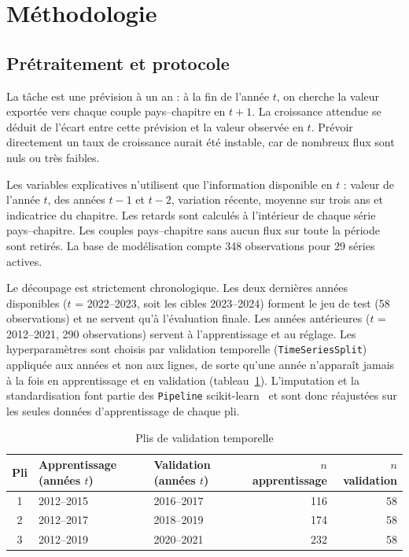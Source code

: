 \documentclass[11pt,a4paper]{article}
\begin{document}
\section{Méthodologie}\label{sec:method}
\subsection{Prétraitement et protocole}
La tâche est une prévision à un an : à la fin de l'année $t$, on cherche la valeur exportée vers chaque couple pays--chapitre en $t+1$. La croissance attendue se déduit de l'écart entre cette prévision et la valeur observée en $t$. Prévoir directement un taux de croissance aurait été instable, car de nombreux flux sont nuls ou très faibles.

Les variables explicatives n'utilisent que l'information disponible en $t$ : valeur de l'année $t$, des années $t-1$ et $t-2$, variation récente, moyenne sur trois ans et indicatrice du chapitre. Les retards sont calculés à l'intérieur de chaque série pays--chapitre. Les couples pays--chapitre sans aucun flux sur toute la période sont retirés. La base de modélisation compte 348 observations pour 29 séries actives.

Le découpage est strictement chronologique. Les deux dernières années disponibles ($t$ = 2022--2023, soit les cibles 2023--2024) forment le jeu de test (58 observations) et ne servent qu'à l'évaluation finale. Les années antérieures ($t$ = 2012--2021, 290 observations) servent à l'apprentissage et au réglage. Les hyperparamètres sont choisis par validation temporelle (\texttt{TimeSeriesSplit}) appliquée aux années et non aux lignes, de sorte qu'une année n'apparaît jamais à la fois en apprentissage et en validation (tableau~\ref{tab:plis}). L'imputation et la standardisation font partie des \texttt{Pipeline} scikit-learn~\cite{sklearn} et sont donc réajustées sur les seules données d'apprentissage de chaque pli.
\begin{table}[H]\centering\small
\caption{Plis de validation temporelle}\label{tab:plis}
\begin{tabular}{cllrr}\toprule
Pli & Apprentissage (années $t$) & Validation (années $t$) & $n$ apprentissage & $n$ validation \\ \midrule
1 & 2012--2015 & 2016--2017 & 116 & 58 \\
2 & 2012--2017 & 2018--2019 & 174 & 58 \\
3 & 2012--2019 & 2020--2021 & 232 & 58 \\
\bottomrule\end{tabular}
\end{table}
\end{document}
